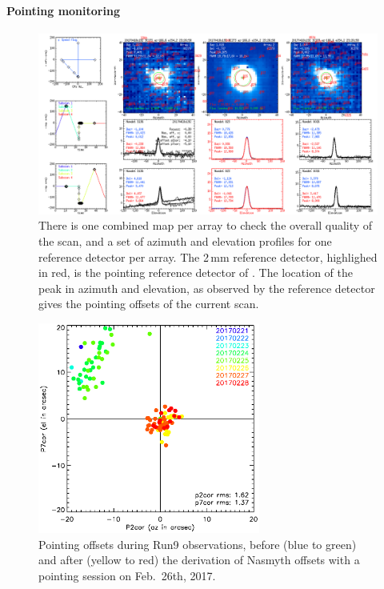 \paragraph{Pointing monitoring}

\begin{figure}[ht!]
\begin{center}
\includegraphics[clip, angle=0, scale = 0.30]{Figures/plot_20170418s192.png}
\caption[Summary plots of the reduction of pointing scan.]{There is one combined
  map per array to check the overall quality of the scan, and a set of azimuth
  and elevation profiles for one reference detector per array. The 2\,mm reference
  detector, highlighed in red, is the pointing reference detector of
  \nika. The location of the peak in azimuth and elevation, as observed by the
  reference detector gives the pointing offsets of the current scan.}
\label{fig:ptg}
\end{center}
\end{figure}

\begin{figure}[ht!]
\begin{center}
\includegraphics[clip, angle=0, trim={0, 0, 3cm, 0}, width=0.65\textwidth]{Figures/pointing_stats_N2R9.eps}
\caption[Pointing session results]{Pointing offsets during Run9 observations,
  before (blue to green) and after (yellow to red) the
  derivation of Nasmyth offsets with a pointing session on Feb.~26th, 2017.}
\label{fig:pointing_stats_n2r9}
\end{center}
\end{figure}

